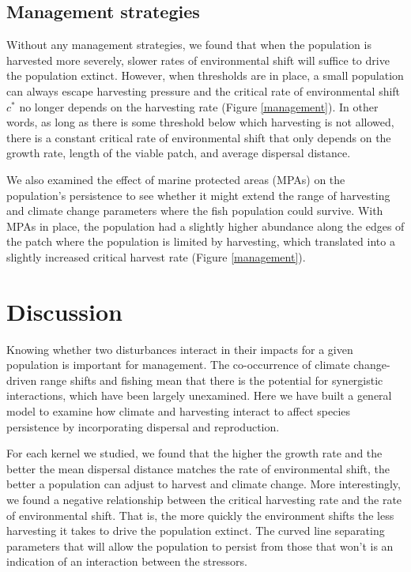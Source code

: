 \documentclass[12pt,english]{article}
\begin{document}
\begin{spacing}{1.9}
\begin{flushleft}
\subsection{Management strategies }

Without any management strategies, we found that when the population is harvested more severely, slower rates of environmental shift will suffice to drive the population extinct.  However, when thresholds are in place, a small population can always escape harvesting pressure and the critical rate of environmental shift $c^*$ no longer depends on the harvesting rate (Figure \ref{management}). In other words, as long as there is some threshold below which harvesting is not allowed, there is a constant critical rate of environmental shift that only depends on the growth rate, length of the viable patch, and average dispersal distance.  

We also examined the effect of marine protected  areas (MPAs) on the population's persistence to see whether it might extend the range of harvesting and  climate change parameters where the fish population could survive. With MPAs in place, the population had a  slightly higher abundance along the edges of the patch where the population is limited by harvesting, which  translated into a slightly increased critical harvest rate (Figure \ref{management}).

\section{Discussion}

Knowing whether two disturbances interact in their impacts for a given population is important for management. The co-occurrence of climate change-driven range shifts and fishing mean that there is the potential for synergistic interactions, which have been largely unexamined.  Here we have built a general model to examine how climate and harvesting interact to affect species persistence by incorporating dispersal and reproduction. 

For each kernel we studied, we found that the higher the growth rate and the better the mean dispersal distance matches the rate of environmental shift, the better a population can adjust to harvest and climate change.  More interestingly, we found a negative relationship between the critical harvesting rate and the rate of environmental shift.  That is, the more quickly the environment shifts the less harvesting it takes to drive the population extinct.  The curved line separating parameters that will allow the population to persist from those that won't is an indication of an interaction between the stressors.


\end{flushleft}
\end{spacing}
\end{document}
